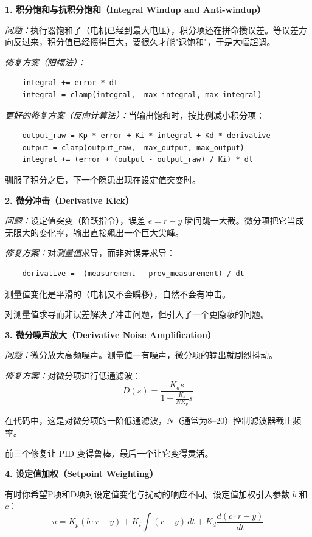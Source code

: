 \textbf{1. 积分饱和与抗积分饱和（Integral Windup and Anti-windup）}

\textit{问题：}执行器饱和了（电机已经到最大电压），积分项还在拼命攒误差。等误差方向反过来，积分值已经攒得巨大，要很久才能"退饱和"，于是大幅超调。

\textit{修复方案（限幅法）：}
\begin{verbatim}
    integral += error * dt
    integral = clamp(integral, -max_integral, max_integral)
\end{verbatim}

\textit{更好的修复方案（反向计算法）：}当输出饱和时，按比例减小积分项：
\begin{verbatim}
    output_raw = Kp * error + Ki * integral + Kd * derivative
    output = clamp(output_raw, -max_output, max_output)
    integral += (error + (output - output_raw) / Ki) * dt
\end{verbatim}

驯服了积分之后，下一个隐患出现在设定值突变时。

\textbf{2. 微分冲击（Derivative Kick）}

\textit{问题：}设定值突变（阶跃指令），误差 $e = r - y$ 瞬间跳一大截。微分项把它当成无限大的变化率，输出直接飙出一个巨大尖峰。

\textit{修复方案：}对\textit{测量值}求导，而非对误差求导：
\begin{verbatim}
    derivative = -(measurement - prev_measurement) / dt
\end{verbatim}

测量值变化是平滑的（电机又不会瞬移），自然不会有冲击。

对测量值求导而非误差解决了冲击问题，但引入了一个更隐蔽的问题。

\textbf{3. 微分噪声放大（Derivative Noise Amplification）}

\textit{问题：}微分放大高频噪声。测量值一有噪声，微分项的输出就剧烈抖动。

\textit{修复方案：}对微分项进行低通滤波：
\begin{equation}
D(s) = \frac{K_d s}{1 + \frac{K_d}{N K_p} s}
\end{equation}

在代码中，这是对微分项的一阶低通滤波，$N$（通常为8--20）控制滤波器截止频率。

前三个修复让 PID 变得鲁棒，最后一个让它变得灵活。

\textbf{4. 设定值加权（Setpoint Weighting）}

有时你希望P项和D项对设定值变化与扰动的响应不同。设定值加权引入参数 $b$ 和 $c$：
\begin{equation}
u = K_p(b \cdot r - y) + K_i \int (r - y) \, dt + K_d \frac{d(c \cdot r - y)}{dt}
\end{equation}

